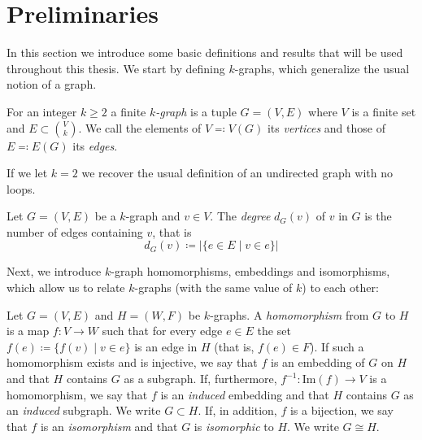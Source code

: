 \section{Preliminaries}\label{sec:preliminaries}
In this section we introduce some basic definitions and results that will be used throughout this thesis.
We start by defining $k$-graphs, which generalize the usual notion of a graph.

\begin{definition}

    For an integer $k \geq 2$ a finite \emph{$k$-graph}
    is a tuple $G = (V, E)$ where $V$ is a finite set
    and $E \subset \binom{V}{k}$.
    We call the elements of $V \eqqcolon V(G)$ its \emph{vertices}
    and those of $E \eqqcolon E(G)$ its \emph{edges}.
\end{definition}

\begin{remark}
    If we let $k=2$ we recover the usual definition of an undirected graph with no loops.
\end{remark}

\begin{definition}
    Let $G = (V, E)$ be a $k$-graph and $v \in V$.
    The \emph{degree} $d_G(v)$ of $v$ in $G$
    is the number of edges containing $v$, that is
    \[
        d_G(v) \coloneqq |\{e \in E \mid v \in e\}|
    \]
\end{definition}

Next, we introduce $k$-graph homomorphisms, embeddings and isomorphisms, which allow us
to relate $k$-graphs (with the same value of $k$) to each other:

\begin{definition}
    Let $G = (V, E)$ and $H = (W, F)$ be $k$-graphs.
    A \emph{homomorphism} from $G$ to $H$ is a map $f: V \to W$
    such that for every edge $e \in E$ the set $f(e) \coloneqq \{f(v) \mid v \in e\}$
    is an edge in $H$ (that is, $f(e) \in F$). If such a homomorphism exists
    and is injective, we say that $f$ is an embedding of $G$ on $H$
    and that $H$ contains $G$ as a subgraph.
    If, furthermore, $f^{-1}: \text{Im}(f) \to V$ is a homomorphism, we say that $f$
    is an \emph{induced} embedding and that $H$ contains $G$ as an \emph{induced}
    subgraph.
    We write $G \subset H$.
    If, in addition, $f$ is a bijection, we say that $f$ is an \emph{isomorphism}
    and that $G$ is \emph{isomorphic} to $H$.
    We write $G \cong H$.
\end{definition}

